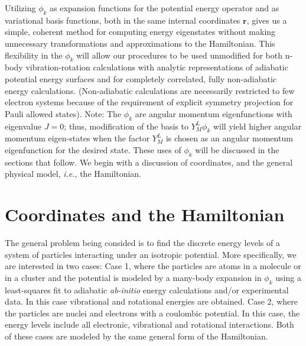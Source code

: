 \documentclass[12pt,thmsa]{article}
\begin{document}
Utilizing $\phi _k$ as expansion functions for the potential energy operator
and as variational basis functions, both in the same internal coordinates $%
\mathbf{r}$, gives us a simple, coherent method for computing energy
eigenstates without making unnecessary transformations and approximations to
the Hamiltonian. This flexibility in the $\phi _k$ will allow our procedures
to be used unmodified for both n-body vibration-rotation calculations with
analytic representations of adiabatic potential energy surfaces and for
completely correlated, fully non-adiabatic energy calculations.
(Non-adiabatic calculations are necessarily restricted to few electron
systems because of the requirement of explicit symmetry projection for Pauli
allowed states). Note: The $\phi _k$ are angular momentum eigenfunctions
with eigenvalue $J=0$; thus, modification of the basis to $Y_M^L\phi _k$
will yield higher angular momentum eigen-states when the factor $Y_M^L$ is
chosen as an angular momentum eigenfunction for the desired state. These
uses of $\phi _k$ will be discussed in the sections that follow. We begin
with a discussion of coordinates, and the general physical model, \textit{%
i.e.}, the Hamiltonian.

\section{ Coordinates and the Hamiltonian}

The general problem being consided is to find the discrete energy levels of
a system of particles interacting under an isotropic potential. More
specifically, we are interested in two cases: Case 1, where the particles
are atoms in a molecule or in a cluster and the potential is modeled by a
many-body expansion in $\phi _k$ using a least-squares fit to adiabatic 
\textit{ab-initio} energy calculations and/or experimental data. In this
case vibrational and rotational energies are obtained. Case 2, where the
particles are nuclei and electrons with a coulombic potential. In this case,
the energy levels include all electronic, vibrational and rotational
interactions. Both of these cases are modeled by the same general form of
the Hamiltonian.
\end{document}
